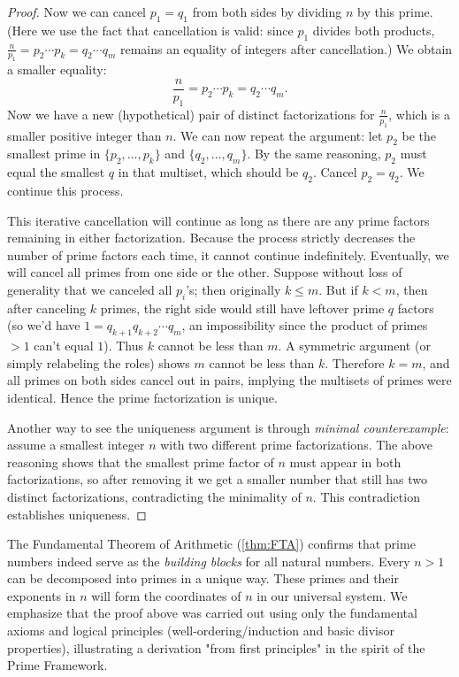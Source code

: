 \documentclass[11pt]{article}
\begin{document}
\begin{proof}
Now we can cancel $p_1 = q_1$ from both sides by dividing $n$ by this prime. (Here we use the fact that cancellation is valid: since $p_1$ divides both products, $\frac{n}{p_1} = p_2 \cdots p_k = q_2 \cdots q_m$ remains an equality of integers after cancellation.) We obtain a smaller equality:
\[ \frac{n}{p_1} = p_2 \cdots p_k = q_2 \cdots q_m. \]
Now we have a new (hypothetical) pair of distinct factorizations for $\frac{n}{p_1}$, which is a smaller positive integer than $n$. We can now repeat the argument: let $p_2$ be the smallest prime in $\{p_2,\dots,p_k\}$ and $\{q_2,\dots,q_m\}$. By the same reasoning, $p_2$ must equal the smallest $q$ in that multiset, which should be $q_2$. Cancel $p_2 = q_2$. We continue this process.

This iterative cancellation will continue as long as there are any prime factors remaining in either factorization. Because the process strictly decreases the number of prime factors each time, it cannot continue indefinitely. Eventually, we will cancel all primes from one side or the other. Suppose without loss of generality that we canceled all $p_i$'s; then originally $k \le m$. But if $k < m$, then after canceling $k$ primes, the right side would still have leftover prime $q$ factors (so we'd have $1 = q_{k+1} q_{k+2} \cdots q_{m}$, an impossibility since the product of primes $>1$ can’t equal $1$). Thus $k$ cannot be less than $m$. A symmetric argument (or simply relabeling the roles) shows $m$ cannot be less than $k$. Therefore $k = m$, and all primes on both sides cancel out in pairs, implying the multisets of primes were identical. Hence the prime factorization is unique.

Another way to see the uniqueness argument is through \emph{minimal counterexample}: assume a smallest integer $n$ with two different prime factorizations. The above reasoning shows that the smallest prime factor of $n$ must appear in both factorizations, so after removing it we get a smaller number that still has two distinct factorizations, contradicting the minimality of $n$. This contradiction establishes uniqueness.
\end{proof}

The Fundamental Theorem of Arithmetic (\Theorem \ref{thm:FTA}) confirms that prime numbers indeed serve as the \emph{building blocks} for all natural numbers. Every $n>1$ can be decomposed into primes in a unique way. These primes and their exponents in $n$ will form the coordinates of $n$ in our universal system. We emphasize that the proof above was carried out using only the fundamental axioms and logical principles (well-ordering/induction and basic divisor properties), illustrating a derivation "from first principles" in the spirit of the Prime Framework.
\end{document}
